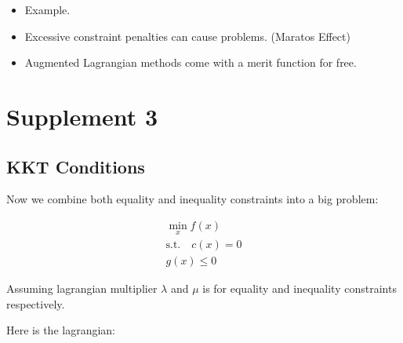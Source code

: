 \begin{itemize}
\begin{itemize}
\begin{equation}
\begin{Vmatrix}
                \nabla _{x} L\\
                \min( 0,c( x))\\
                d( x)
                \end{Vmatrix}_2^2
        \end{equation}
        \item Weighted sum of the objective and the constraint violations:
        \begin{equation}
            p(x,\lambda,\mu) = f(x) + \rho\begin{Vmatrix}
                \min( 0,c( x))\\
                d( x)
                \end{Vmatrix}_1 \qquad \text{any norm is OK}
        \end{equation}
        \item Augmented Lagrangian:
        \begin{equation}
            p(x,\lambda,\mu) = L_p(x,\lambda,\mu)
        \end{equation}
    \end{itemize}
    \item Example.
    \item Excessive constraint penalties can cause problems. (Maratos Effect)
    \item Augmented Lagrangian methods come with a merit function for free.
\end{itemize}

\section{Supplement 3}

\subsection{KKT Conditions}

Now we combine both equality and inequality constraints into a big problem:

\begin{gather*}
    \min_{x} f( x)\\
    \text{s.t.} \quad c( x) =0\\
    g( x) \le 0
\end{gather*}

Assuming lagrangian multiplier $\lambda$ and $\mu$ is for equality and inequality constraints respectively. 

Here is the lagrangian:

